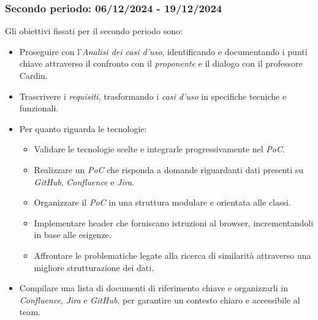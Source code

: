 \subsubsection{Secondo periodo: 06/12/2024 - 19/12/2024}
\label{sec:prev_cons_secondo_periodo}
Gli obiettivi fissati per il secondo periodo sono:
    \begin{itemize}
        \item Proseguire con l’\emph{Analisi dei casi d’uso}, identificando e documentando i punti chiave attraverso il confronto con il \emph{proponente} e il dialogo con il professore Cardin.
        \item Trascrivere i \emph{requisiti}, trasformando i \emph{casi d’uso} in specifiche tecniche e funzionali.
        \item Per quanto riguarda le tecnologie:
        \begin{itemize}
            \item Validare le tecnologie scelte e integrarle progressivamente nel \emph{PoC}.
            \item Realizzare un \emph{PoC} che risponda a domande riguardanti dati presenti su \emph{GitHub}, \emph{Confluence} e \emph{Jira}.
            \item Organizzare il \emph{PoC} in una struttura modulare e orientata alle classi.
            \item Implementare header che forniscano istruzioni al browser, incrementandoli in base alle esigenze.
            \item Affrontare le problematiche legate alla ricerca di similarità attraverso una migliore strutturazione dei dati.
        \end{itemize}
        \item Compilare una lista di documenti di riferimento chiave e organizzarli in \emph{Confluence}, \emph{Jira} e \emph{GitHub}, per garantire un contesto chiaro e accessibile al team.
    \end{itemize}
    

